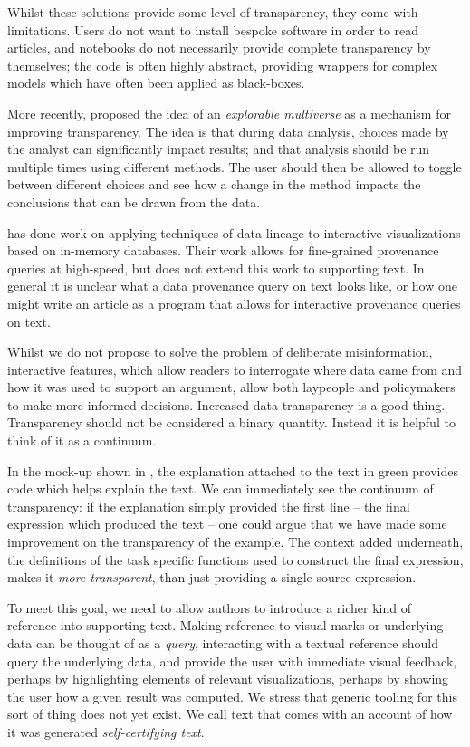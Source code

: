 Whilst these solutions provide some level of transparency, they come with limitations. Users do not want to
install bespoke software in order to read articles, and notebooks do not necessarily provide complete
transparency by themselves; the code is often highly abstract, providing wrappers for complex models which
have often been applied as black-boxes.

More recently, \cite{dragicevic19} proposed the idea of an \emph{explorable multiverse} as a mechanism for
improving transparency. The idea is that during data analysis, choices made by the analyst can significantly
impact results; and that analysis should be run multiple times using different methods. The user should then
be allowed to toggle between different choices and see how a change in the method impacts the conclusions that
can be drawn from the data.

\cite{psallidas18} has done work on applying techniques of data lineage to interactive visualizations based on
in-memory databases. Their work allows for fine-grained provenance queries at high-speed, but does not extend
this work to supporting text. In general it is unclear what a data provenance query on text looks like, or how
one might write an article as a program that allows for interactive provenance queries on text.

Whilst we do not propose to solve the problem of deliberate misinformation, interactive features, which allow
readers to interrogate where data came from and how it was used to support an argument, allow both laypeople
and policymakers to make more informed decisions. Increased data transparency is a good thing. Transparency
should not be considered a binary quantity. Instead it is helpful to think of it as a continuum.

In the mock-up shown in , the explanation attached to the text in green provides code
which helps explain the text. We can immediately see the continuum of transparency: if the explanation simply
provided the first line -- the final expression which produced the text -- one could argue that we have made
some improvement on the transparency of the example. The context added underneath, the definitions of the task
specific functions used to construct the final expression, makes it \emph{more transparent}, than just
providing a single source expression.

To meet this goal, we need to allow authors to introduce a richer kind of reference into supporting text.
Making reference to visual marks or underlying data can be thought of as a \emph{query}, interacting with a
textual reference should query the underlying data, and provide the user with immediate visual feedback,
perhaps by highlighting elements of relevant visualizations, perhaps by showing the user how a given result
was computed. We stress that generic tooling for this sort of thing does not yet exist. We call text that
comes with an account of how it was generated \emph{self-certifying text}.

